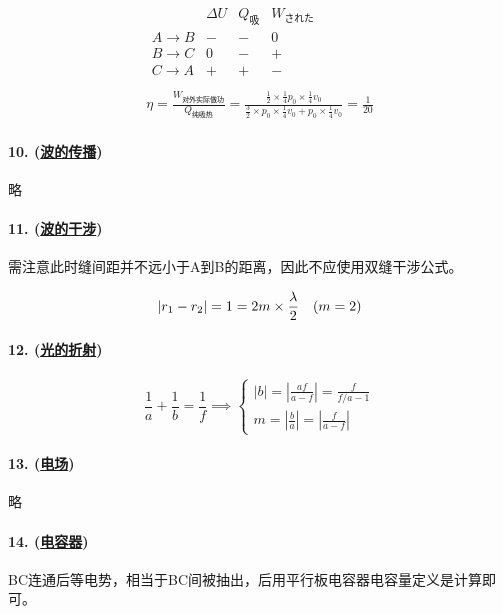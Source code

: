 \begin{gather*}
    \begin{array}{c|ccc}
        & \Delta U & Q_\textrm{吸} & W_\textrm{された} \\\hline
        A\to B & - & - & 0 \\
        B\to C & 0 & - & + \\
        C\to A & + & + & - \\
    \end{array}\\
    \eta=\frac{W_\textrm{对外实际做功}}{Q_\textrm{纯吸热}}
    =\frac{\frac12\times\frac14p_0\times\frac14v_0}{\frac32\times p_0\times\frac14v_0+p_0\times\frac14v_0}=\frac{1}{20}
\end{gather*}

\paragraph{10. (\hyperref[subsec:波的传播]{波的传播})} 略
\paragraph{11. (\hyperref[subsec:波的干涉]{波的干涉})} 需注意此时缝间距并不远小于A到B的距离，因此不应使用双缝干涉公式。

\begin{equation*}
    |r_1-r_2|=1=2m\times\frac\lambda2\quad(m=2)\\
\end{equation*}

\paragraph{12. (\hyperref[subsec:光的折射]{光的折射})}

\begin{equation*}
    \frac1a+\frac1b=\frac1f\implies
    \begin{cases}
        |b|=\left|\frac{af}{a-f}\right|=\frac{f}{f/a-1}\\
        m=\left|\frac{b}{a}\right|=\left|\frac{f}{a-f}\right|
    \end{cases}
\end{equation*}

\paragraph{13. (\hyperref[subsec:电场]{电场})} 略
\paragraph{14. (\hyperref[subsec:电容器]{电容器})} BC连通后等电势，相当于BC间被抽出，后用平行板电容器电容量定义是计算即可。

